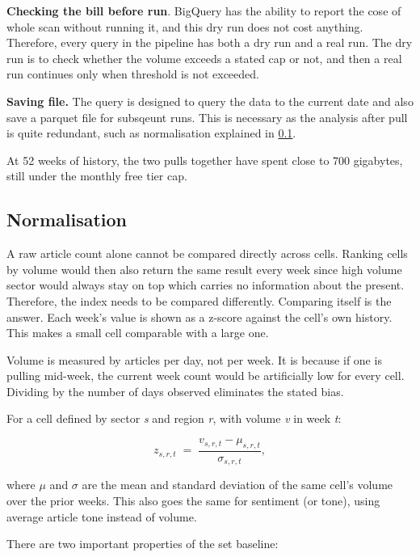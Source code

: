 \documentclass[ %
                    author={Natchalin Iwsakul \\[0.4em] Inkaphol Siriwongwattana \\[0.4em] Tanaphan Kummaraphat \\[0.6em] Patorn Srisupap},,
                supervisor={Fernando Moreno-Pino},
                    degree={MSc},
                     title={Propensity Modelling for SME Commercial Lending Using Open Public Data
},
                  subtitle={Companies House and GDELT as predictors of first-time borrowing},
                      type={},
                      year={2026}]{dissertation}
\begin{document}
    \textbf{Checking the bill before run}. BigQuery has the ability to report the cose of whole scan without running it, and this dry run does not cost anything. Therefore, every query in the pipeline has both a dry run and a real run. The dry run is to check whether the volume exceeds a stated cap or not, and then a real run continues only when threshold is not exceeded.
    
    \textbf{Saving file.} The query is designed to query the data to the current date and also save a parquet file for subsqeunt runs. This is necessary as the analysis after pull is quite redundant, such as normalisation explained in \ref{chap:normalisation}.

    At 52 weeks of history, the two pulls together have spent close to 700 gigabytes, still under the monthly free tier cap.
        
  \subsection{Normalisation}
  \label{chap:normalisation}

    A raw article count alone cannot be compared directly across cells. Ranking cells by volume would then also return the same result every week since high volume sector would always stay on top which carries no information about the present. Therefore, the index needs to be compared differently. Comparing itself is the answer. Each week's value is shown as a z-score against the cell's own history. This makes a small cell comparable with a large one.

    Volume is measured by articles per day, not per week. It is because if one is pulling mid-week, the current week count would be artificially low for every cell. Dividing by the number of days observed eliminates the stated bias.

    For a cell defined by sector \textit{s} and region \textit{r}, with volume \textit{v} in week \textit{t}:

    \begin{equation}
      z_{s,r,t} \;=\; \frac{v_{s,r,t} - \mu_{s,r,t}}{\sigma_{s,r,t}} ,
      \label{eq:zscore}
    \end{equation}

    where $\mu$ and $\sigma$ are the mean and standard deviation of the same cell's volume over the prior weeks. This also goes the same for sentiment (or tone), using average article tone instead of volume.

    There are two important properties of the set baseline:
\end{document}
